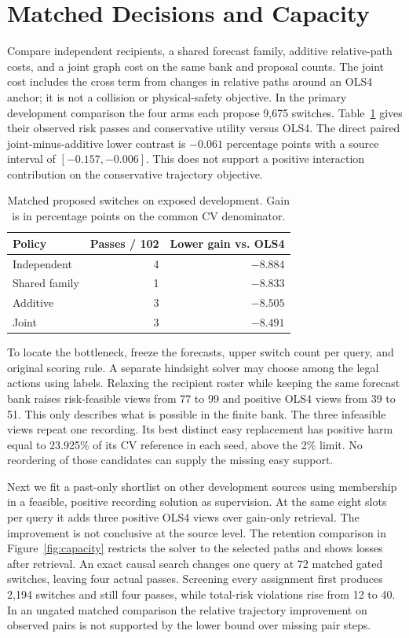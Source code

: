 \documentclass[10pt,twocolumn,letterpaper]{article}
\begin{document}
\section{Matched Decisions and Capacity}
Compare independent recipients, a shared forecast family, additive
relative-path costs, and a joint graph cost on the same bank and
proposal counts. The joint cost includes the cross term from changes
in relative paths around an OLS4 anchor; it is not a collision or
physical-safety objective. In the primary development comparison the
four arms each propose 9,675 switches. Table~\ref{tab:matched} gives
their observed risk passes and conservative utility versus OLS4.
The direct paired joint-minus-additive lower contrast is $-0.061$
percentage points with a source interval of $[-0.157,-0.006]$.
This does not support a positive interaction contribution on the
conservative trajectory objective.

\begin{table}[t]
\centering\small
\caption{Matched proposed switches on exposed development.
Gain is in percentage points on the common CV denominator.}
\label{tab:matched}
\begin{tabular}{@{}lrr@{}}
\toprule
Policy & Passes / 102 & Lower gain vs. OLS4 \\
\midrule
Independent & 4 & $-8.884$ \\
Shared family & 1 & $-8.833$ \\
Additive & 3 & $-8.505$ \\
Joint & 3 & $-8.491$ \\
\bottomrule
\end{tabular}
\end{table}

To locate the bottleneck, freeze the forecasts, upper switch count
per query, and original scoring rule. A separate hindsight solver
may choose among the legal actions using labels. Relaxing the
recipient roster while keeping the same forecast bank raises
risk-feasible views from 77 to 99 and positive OLS4 views from
39 to 51. This only describes what is possible in the finite bank.
The three infeasible views repeat one recording. Its best distinct
easy replacement has positive harm equal to 23.925\% of its CV
reference in each seed, above the 2\% limit. No reordering of
those candidates can supply the missing easy support.

Next we fit a past-only shortlist on other development sources
using membership in a feasible, positive recording solution as
supervision. At the same eight slots per query it adds three
positive OLS4 views over gain-only retrieval. The improvement
is not conclusive at the source level. The retention comparison
in Figure~\ref{fig:capacity} restricts the solver to the selected
paths and shows losses after retrieval. An exact causal search
changes one query at 72 matched gated switches, leaving four
actual passes. Screening every assignment first produces 2,194
switches and still four passes, while total-risk violations rise
from 12 to 40. In an ungated matched comparison the relative
trajectory improvement on observed pairs is not supported by
the lower bound over missing pair steps.
\end{document}

